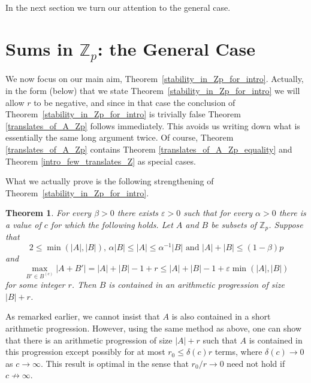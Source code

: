 \documentclass[12pt,reqno]{amsart}
\newtheorem{theorem}{Theorem}
\theoremstyle{definition}
\renewcommand\leq{\leqslant}
\renewcommand\le{\leqslant}
\begin{document}
\vspace{5pt}
In the next section we turn our attention to the general case.

\section{Sums in ${\mathbb Z}_p$: the General Case}

We now focus on our main aim, Theorem~\ref{stability_in_Zp_for_intro}.
Actually, in the form (below) that we state Theorem~\ref{stability_in_Zp_for_intro} we will allow $r$ to be negative, and since in that case the
conclusion of Theorem~\ref{stability_in_Zp_for_intro} is trivially false Theorem \ref{translates_of_A_Zp} follows immediately. This avoids us writing down
what is essentially the same long argument twice. Of course, Theorem \ref{translates_of_A_Zp} contains
Theorem \ref{translates_of_A_Zp_equality} and Theorem \ref{intro_few_translates_Z}
as special cases.

\vspace{5pt}
What we actually prove is the following strengthening of Theorem~\ref{stability_in_Zp_for_intro}.

\begin{theorem}\label{strong_stab_B_Z_p}
  For every $\beta>0$ there exists $\varepsilon>0$ such that for every $\alpha>0$ there is a value of $c$ for which the
  following holds. Let $A$ and $B$ be subsets of $\mathbb{Z}_p$. Suppose that
\begin{equation}\label{eq34.-2}
    2\leq \min(|A|,|B|) \text{, } \alpha |B| \leq |A| \leq \alpha^{-1} |B| \text{ and } |A|+|B|\leq (1-\beta)p
\end{equation}
and
\begin{equation}\label{eq34.-1}
    \max_{B'\in B^{(c)}}|A+B'|= |A|+|B|-1+r \leq |A|+|B|-1+\varepsilon \min(|A|,|B|)
  \end{equation}
for some integer $r$.
Then $B$ is contained in an arithmetic progression of size $|B|+r$.
\end{theorem}

\vspace{5pt}

As remarked earlier, we cannot insist that $A$ is also contained in a short arithmetic
progression. However,
using the same method as above, one can show that there is an arithmetic progression of size
$|A|+r$ such that $A$
is contained in this progression except possibly for at
most $r_0\le \delta(c)r$ terms, where $\delta(c) \to 0$
as $c\to \infty$. This result is optimal in the sense
that $r_0/r \to 0$ need not hold if $c \not\to \infty$.
\end{document}
